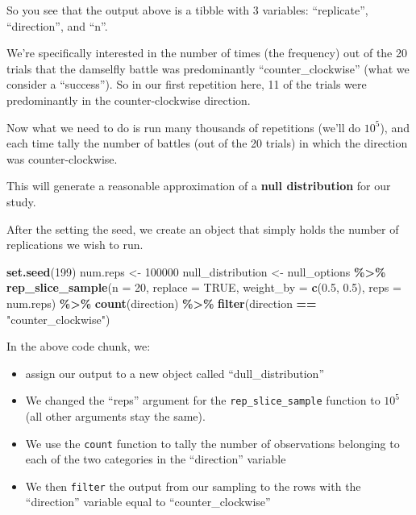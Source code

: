 \documentclass[
]{book}
\newenvironment{Shaded}{\begin{snugshade}}{\end{snugshade}}
\newcommand{\AttributeTok}[1]{\textcolor[rgb]{0.13,0.29,0.53}{#1}}
\newcommand{\ConstantTok}[1]{\textcolor[rgb]{0.56,0.35,0.01}{#1}}
\newcommand{\DecValTok}[1]{\textcolor[rgb]{0.00,0.00,0.81}{#1}}
\newcommand{\FloatTok}[1]{\textcolor[rgb]{0.00,0.00,0.81}{#1}}
\newcommand{\FunctionTok}[1]{\textcolor[rgb]{0.13,0.29,0.53}{\textbf{#1}}}
\newcommand{\NormalTok}[1]{#1}
\newcommand{\OtherTok}[1]{\textcolor[rgb]{0.56,0.35,0.01}{#1}}
\newcommand{\SpecialCharTok}[1]{\textcolor[rgb]{0.81,0.36,0.00}{\textbf{#1}}}
\newcommand{\StringTok}[1]{\textcolor[rgb]{0.31,0.60,0.02}{#1}}
\providecommand{\tightlist}{%
  \setlength{\itemsep}{0pt}\setlength{\parskip}{0pt}}
\begin{document}
So you see that the output above is a tibble with 3 variables: ``replicate'', ``direction'', and ``n''.

We're specifically interested in the number of times (the frequency) out of the 20 trials that the damselfly battle was predominantly ``counter\_clockwise'' (what we consider a ``success''). So in our first repetition here, 11 of the trials were predominantly in the counter-clockwise direction.

Now what we need to do is run many thousands of repetitions (we'll do \ensuremath{10^{5}}), and each time tally the number of battles (out of the 20 trials) in which the direction was counter-clockwise.

This will generate a reasonable approximation of a \textbf{null distribution} for our study.

After the setting the seed, we create an object that simply holds the number of replications we wish to run.

\begin{Shaded}
\begin{Highlighting}[]
\FunctionTok{set.seed}\NormalTok{(}\DecValTok{199}\NormalTok{)}
\NormalTok{num.reps }\OtherTok{\textless{}{-}} \DecValTok{100000}
\NormalTok{null\_distribution }\OtherTok{\textless{}{-}}\NormalTok{ null\_options }\SpecialCharTok{\%\textgreater{}\%}
  \FunctionTok{rep\_slice\_sample}\NormalTok{(}\AttributeTok{n =} \DecValTok{20}\NormalTok{, }\AttributeTok{replace =} \ConstantTok{TRUE}\NormalTok{, }\AttributeTok{weight\_by =} \FunctionTok{c}\NormalTok{(}\FloatTok{0.5}\NormalTok{, }\FloatTok{0.5}\NormalTok{), }\AttributeTok{reps =}\NormalTok{ num.reps) }\SpecialCharTok{\%\textgreater{}\%}
  \FunctionTok{count}\NormalTok{(direction) }\SpecialCharTok{\%\textgreater{}\%}
  \FunctionTok{filter}\NormalTok{(direction }\SpecialCharTok{==} \StringTok{"counter\_clockwise"}\NormalTok{)}
\end{Highlighting}
\end{Shaded}

In the above code chunk, we:

\begin{itemize}
\tightlist
\item
  assign our output to a new object called ``dull\_distribution''
\item
  We changed the ``reps'' argument for the \texttt{rep\_slice\_sample} function to \ensuremath{10^{5}} (all other arguments stay the same).
\item
  We use the \texttt{count} function to tally the number of observations belonging to each of the two categories in the ``direction'' variable
\item
  We then \texttt{filter} the output from our sampling to the rows with the ``direction'' variable equal to ``counter\_clockwise''
\end{itemize}
\end{document}
